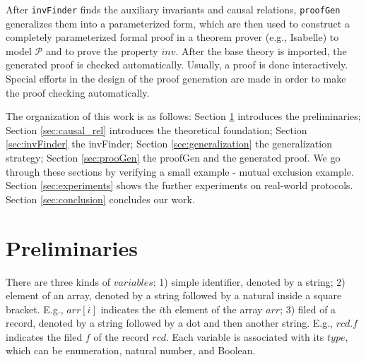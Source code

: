 \documentclass[final]{IEEEtran}
\begin{document}
After {\tt invFinder} finds the auxiliary invariants and causal relations, {\tt proofGen} generalizes them  into a parameterized form, which are then used to construct a completely parameterized formal proof in a theorem prover (e.g., Isabelle) to model $\mathcal{P}$ and to prove the property $inv$. After the base theory is imported, the generated proof is checked automatically.  Usually, a proof is done interactively. Special efforts in the design of the proof generation are made in order to make the proof checking automatically. %

The organization of this work is as follows: Section \ref{sec:Preliminaries} introduces the preliminaries; Section  \ref{sec:causal_rel} introduces the theoretical foundation; Section \ref{sec:invFinder} the {\sf invFinder}; Section \ref{sec:generalization} the generalization strategy; Section \ref{sec:prooGen} the {\sf proofGen} and the generated proof. We go through these sections by verifying a small example - mutual exclusion example. Section \ref{sec:experiments} shows the further experiments on real-world protocols. Section \ref{sec:conclusion} concludes our work.

\section{Preliminaries}\label{sec:Preliminaries}
There are three kinds of $variables$:
1) simple identifier, denoted by a string;
2) element of an array, denoted by a string followed by a natural inside a square bracket. E.g., $arr[i]$ indicates the $i$th element of the array $arr$;
3) filed of a record, denoted by a string followed by a dot and then another string. E.g., $rcd.f$ indicates the filed $f$ of the record $rcd$.
Each variable is associated with its $type$, which can be enumeration, natural number, and Boolean.
\end{document}
